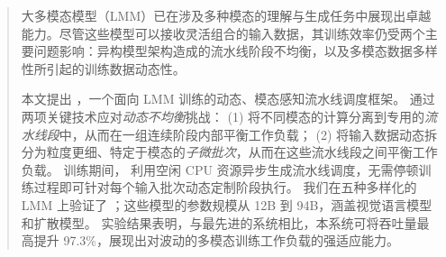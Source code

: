 \begin{abstract}

大多模态模型（LMM）已在涉及多种模态的理解与生成任务中展现出卓越能力。尽管这些模型可以接收灵活组合的输入数据，其训练效率仍受两个主要问题影响：异构模型架构造成的流水线阶段不均衡，以及多模态数据多样性所引起的训练数据动态性。

本文提出 \sys{}，一个面向 LMM 训练的动态、模态感知流水线调度框架。\sys{} 通过两项关键技术应对\emph{动态不均衡}挑战：
(1) 将不同模态的计算分离到专用的\emph{流水线段}中，从而在一组连续阶段内部平衡工作负载；
(2) 将输入数据动态拆分为粒度更细、特定于模态的\emph{子微批次}，从而在这些流水线段之间平衡工作负载。
训练期间，\sys{} 利用空闲 CPU 资源异步生成流水线调度，无需停顿训练过程即可针对每个输入批次动态定制阶段执行。
我们在五种多样化的 LMM 上验证了 \sys{}；这些模型的参数规模从 12B 到 94B，涵盖视觉语言模型和扩散模型。
实验结果表明，与最先进的系统相比，本系统可将吞吐量最高提升 97.3\%，展现出对波动的多模态训练工作负载的强适应能力。

\end{abstract}
